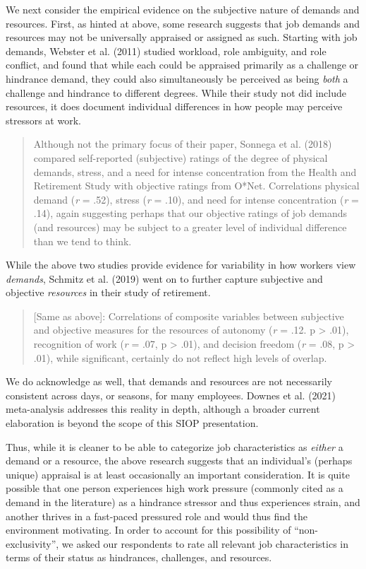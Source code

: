 \documentclass[
  man]{apa6}
\begin{document}
We next consider the empirical evidence on the subjective nature of demands and resources. First, as hinted at above, some research suggests that job demands and resources may not be universally appraised or assigned as such. Starting with job demands, Webster et al. (2011) studied workload, role ambiguity, and role conflict, and found that while each could be appraised primarily as a challenge or hindrance demand, they could also simultaneously be perceived as being \emph{both} a challenge and hindrance to different degrees. While their study not did include resources, it does document individual differences in how people may perceive stressors at work.

\begin{quote}
Although not the primary focus of their paper, Sonnega et al. (2018) compared self-reported (subjective) ratings of the degree of physical demands, stress, and a need for intense concentration from the Health and Retirement Study with objective ratings from O*Net. Correlations physical demand (\emph{r} = .52), stress (\emph{r} = .10), and need for intense concentration (\emph{r} = .14), again suggesting perhaps that our objective ratings of job demands (and resources) may be subject to a greater level of individual difference than we tend to think.
\end{quote}

While the above two studies provide evidence for variability in how workers view \emph{demands}, Schmitz et al. (2019) went on to further capture subjective and objective \emph{resources} in their study of retirement.

\begin{quote}
{[}Same as above{]}: Correlations of composite variables between subjective and objective measures for the resources of autonomy (\emph{r} = .12. p \textgreater{} .01), recognition of work (\emph{r} = .07, p \textgreater{} .01), and decision freedom (\emph{r} = .08, p \textgreater{} .01), while significant, certainly do not reflect high levels of overlap.
\end{quote}

We do acknowledge as well, that demands and resources are not necessarily consistent across days, or seasons, for many employees. Downes et al. (2021) meta-analysis addresses this reality in depth, although a broader current elaboration is beyond the scope of this SIOP presentation.

Thus, while it is cleaner to be able to categorize job characteristics as \emph{either} a demand or a resource, the above research suggests that an individual's (perhaps unique) appraisal is at least occasionally an important consideration. It is quite possible that one person experiences high work pressure (commonly cited as a demand in the literature) as a hindrance stressor and thus experiences strain, and another thrives in a fast-paced pressured role and would thus find the environment motivating. In order to account for this possibility of ``non-exclusivity'', we asked our respondents to rate all relevant job characteristics in terms of their status as hindrances, challenges, and resources.
\end{document}

